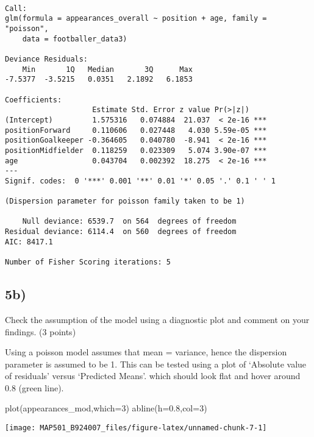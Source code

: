 \documentclass[
]{article}
\newenvironment{Shaded}{\begin{snugshade}}{\end{snugshade}}
\newcommand{\AttributeTok}[1]{\textcolor[rgb]{0.77,0.63,0.00}{#1}}
\newcommand{\DecValTok}[1]{\textcolor[rgb]{0.00,0.00,0.81}{#1}}
\newcommand{\FloatTok}[1]{\textcolor[rgb]{0.00,0.00,0.81}{#1}}
\newcommand{\FunctionTok}[1]{\textcolor[rgb]{0.00,0.00,0.00}{#1}}
\newcommand{\NormalTok}[1]{#1}
\begin{document}
\begin{verbatim}

Call:
glm(formula = appearances_overall ~ position + age, family = "poisson", 
    data = footballer_data3)

Deviance Residuals: 
    Min       1Q   Median       3Q      Max  
-7.5377  -3.5215   0.0351   2.1892   6.1853  

Coefficients:
                    Estimate Std. Error z value Pr(>|z|)    
(Intercept)         1.575316   0.074884  21.037  < 2e-16 ***
positionForward     0.110606   0.027448   4.030 5.59e-05 ***
positionGoalkeeper -0.364605   0.040780  -8.941  < 2e-16 ***
positionMidfielder  0.118259   0.023309   5.074 3.90e-07 ***
age                 0.043704   0.002392  18.275  < 2e-16 ***
---
Signif. codes:  0 '***' 0.001 '**' 0.01 '*' 0.05 '.' 0.1 ' ' 1

(Dispersion parameter for poisson family taken to be 1)

    Null deviance: 6539.7  on 564  degrees of freedom
Residual deviance: 6114.4  on 560  degrees of freedom
AIC: 8417.1

Number of Fisher Scoring iterations: 5
\end{verbatim}

\hypertarget{b-3}{%
\subsection{5b)}\label{b-3}}

Check the assumption of the model using a diagnostic plot and comment on
your findings. (3 points)

Using a poisson model assumes that mean = variance, hence the dispersion
parameter is assumed to be 1. This can be tested using a plot of
`Absolute value of residuals' versus `Predicted Means'. which should
look flat and hover around 0.8 (green line).

\begin{Shaded}
\begin{Highlighting}[]
\FunctionTok{plot}\NormalTok{(appearances\_mod,}\AttributeTok{which=}\DecValTok{3}\NormalTok{)}
\FunctionTok{abline}\NormalTok{(}\AttributeTok{h=}\FloatTok{0.8}\NormalTok{,}\AttributeTok{col=}\DecValTok{3}\NormalTok{)}
\end{Highlighting}
\end{Shaded}

\begin{center}\texttt{[image: MAP501\_B924007\_files/figure-latex/unnamed-chunk-7-1]} \end{center}
\end{document}
